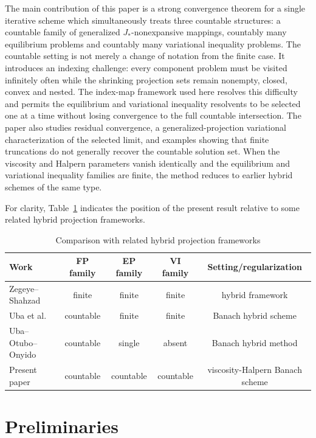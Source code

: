 \documentclass[leqno,12pt]{amsart}
\theoremstyle{definition}
\numberwithin{equation}{section}
\begin{document}
The main contribution of this paper is a strong convergence theorem for a single iterative scheme which simultaneously treats three countable structures: a countable family of generalized $J_{*}$-nonexpansive mappings, countably many equilibrium problems and countably many variational inequality problems. The countable setting is not merely a change of notation from the finite case. It introduces an indexing challenge: every component problem must be visited infinitely often while the shrinking projection sets remain nonempty, closed, convex and nested. The index-map framework used here resolves this difficulty and permits the equilibrium and variational inequality resolvents to be selected one at a time without losing convergence to the full countable intersection. The paper also studies residual convergence, a generalized-projection variational characterization of the selected limit, and examples showing that finite truncations do not generally recover the countable solution set. When the viscosity and Halpern parameters vanish identically and the equilibrium and variational inequality families are finite, the method reduces to earlier hybrid schemes of the same type.

For clarity, Table~\ref{comparison-table} indicates the position of the present result relative to some related hybrid projection frameworks.
\begin{table}[ht]
\centering
\footnotesize
\caption{Comparison with related hybrid projection frameworks}
\label{comparison-table}
\renewcommand{\arraystretch}{1.18}
\begin{tabular}{lcccc}
\hline
Work & FP family & EP family & VI family & Setting/regularization \\
\hline
Zegeye--Shahzad \cite{ZegeyeShahzad2011,ZegeyeShahzad2014} & finite & finite & finite & hybrid framework \\
Uba et al. \cite{UbaCarpathian2023} & countable & finite & finite & Banach hybrid scheme \\
Uba--Otubo--Onyido \cite{UbaOtuboOnyido2021} & countable & single & absent & Banach hybrid method \\
Present paper & countable & countable & countable & viscosity-Halpern Banach scheme \\
\hline
\end{tabular}
\end{table}

\section{Preliminaries}
\end{document}
